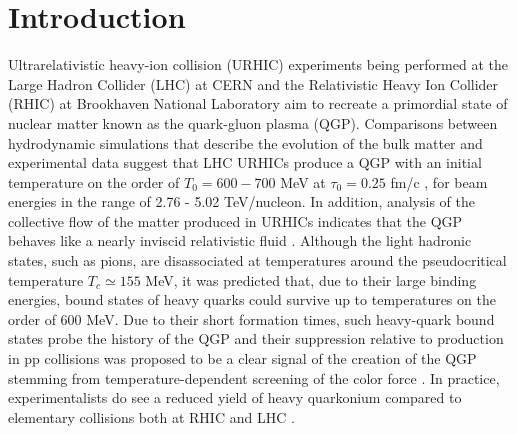 
\section{Introduction}
\label{sec:intro}

Ultrarelativistic heavy-ion collision (URHIC) experiments being performed at the Large Hadron Collider (LHC) at CERN and the Relativistic Heavy Ion Collider (RHIC) at Brookhaven National Laboratory aim to recreate a primordial state of nuclear matter known as the quark-gluon plasma (QGP). Comparisons between hydrodynamic simulations that describe the evolution of the bulk matter and experimental data suggest that LHC URHICs produce a QGP with an initial temperature on the order of $T_{0}=600{-}700$ MeV at $\tau_0 = 0.25$ fm/c \cite{Romatschke:2009im,Heinz:2013AnnRevNuc,Schenke:2011tv,*Gale:2013IntJModPhys,*Ryu:2015vwa,Niemi:2015qia,*Niemi:2015voa,Alqahtani:2017jwl,Alqahtani:2017tnq}, for beam energies in the range of 2.76 - 5.02 TeV/nucleon.  In addition, analysis of the collective flow of the matter produced in URHICs indicates that the QGP behaves like a nearly inviscid relativistic fluid \cite{Romatschke:2009im,Schenke:2011tv,Heinz:2013AnnRevNuc,Gale:2013IntJModPhys,Ryu:2015vwa,Niemi:2015qia,Niemi:2015voa,Alqahtani:2017jwl,*Alqahtani:2017tnq}.  Although the light hadronic states, such as pions, are disassociated at temperatures around the pseudocritical temperature $T_c \simeq 155$ MeV, it was predicted that, due to their large binding energies, bound states of heavy quarks could survive up to temperatures on the order of 600 MeV.  Due to their short formation times, such heavy-quark bound states probe the history of the QGP and their suppression relative to production in pp collisions was proposed to be a clear signal of the creation of the QGP stemming from temperature-dependent screening of the color force \cite{Matsui:1986dk,Karsch:1987pv}.  In practice, experimentalists do see a reduced yield of heavy quarkonium compared to elementary collisions both at RHIC and LHC \cite{Andronic:2015wma,Mocsy:2013syh}. 

